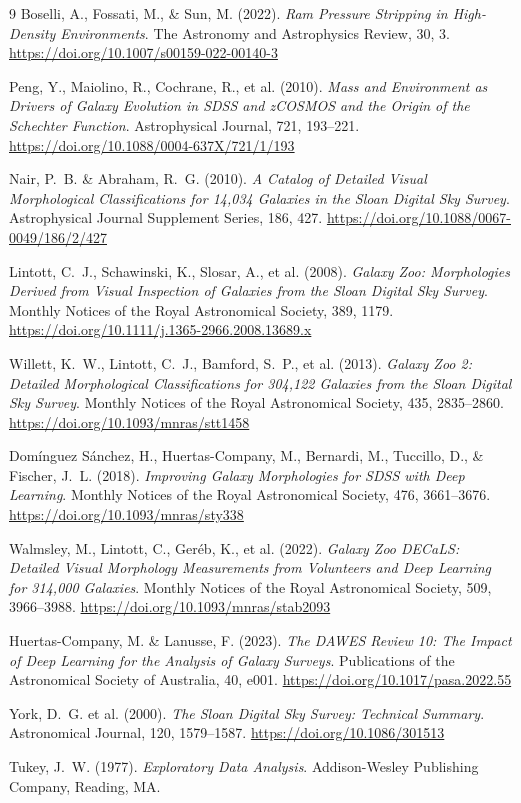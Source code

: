 \documentclass[12pt, a4paper]{article}
\begin{document}
\begin{thebibliography}{9}
Boselli, A., Fossati, M., \& Sun, M. (2022).
\textit{Ram Pressure Stripping in High-Density Environments}.
The Astronomy and Astrophysics Review, 30, 3.
\url{https://doi.org/10.1007/s00159-022-00140-3}

Peng, Y., Maiolino, R., Cochrane, R., et al. (2010).
\textit{Mass and Environment as Drivers of Galaxy Evolution in SDSS and zCOSMOS and the Origin of the Schechter Function}.
Astrophysical Journal, 721, 193--221.
\url{https://doi.org/10.1088/0004-637X/721/1/193}

Nair, P.~B. \& Abraham, R.~G. (2010).
\textit{A Catalog of Detailed Visual Morphological Classifications for 14,034 Galaxies in the Sloan Digital Sky Survey}.
Astrophysical Journal Supplement Series, 186, 427.
\url{https://doi.org/10.1088/0067-0049/186/2/427}

Lintott, C.~J., Schawinski, K., Slosar, A., et al. (2008).
\textit{Galaxy Zoo: Morphologies Derived from Visual Inspection of Galaxies from the Sloan Digital Sky Survey}.
Monthly Notices of the Royal Astronomical Society, 389, 1179.
\url{https://doi.org/10.1111/j.1365-2966.2008.13689.x}

Willett, K.~W., Lintott, C.~J., Bamford, S.~P., et al. (2013).
\textit{Galaxy Zoo 2: Detailed Morphological Classifications for 304,122 Galaxies from the Sloan Digital Sky Survey}.
Monthly Notices of the Royal Astronomical Society, 435, 2835--2860.
\url{https://doi.org/10.1093/mnras/stt1458}

Domínguez Sánchez, H., Huertas-Company, M., Bernardi, M., Tuccillo, D., \& Fischer, J.~L. (2018).
\textit{Improving Galaxy Morphologies for SDSS with Deep Learning}.
Monthly Notices of the Royal Astronomical Society, 476, 3661--3676.
\url{https://doi.org/10.1093/mnras/sty338}

Walmsley, M., Lintott, C., Geréb, K., et al. (2022).
\textit{Galaxy Zoo DECaLS: Detailed Visual Morphology Measurements from Volunteers and Deep Learning for 314,000 Galaxies}.
Monthly Notices of the Royal Astronomical Society, 509, 3966--3988.
\url{https://doi.org/10.1093/mnras/stab2093}

Huertas-Company, M. \& Lanusse, F. (2023).
\textit{The DAWES Review 10: The Impact of Deep Learning for the Analysis of Galaxy Surveys}.
Publications of the Astronomical Society of Australia, 40, e001.
\url{https://doi.org/10.1017/pasa.2022.55}

York, D.~G. et al. (2000).
\textit{The Sloan Digital Sky Survey: Technical Summary}.
Astronomical Journal, 120, 1579--1587.
\url{https://doi.org/10.1086/301513}

Tukey, J.~W. (1977).
\textit{Exploratory Data Analysis}.
Addison-Wesley Publishing Company, Reading, MA.

\end{thebibliography}
\end{document}
